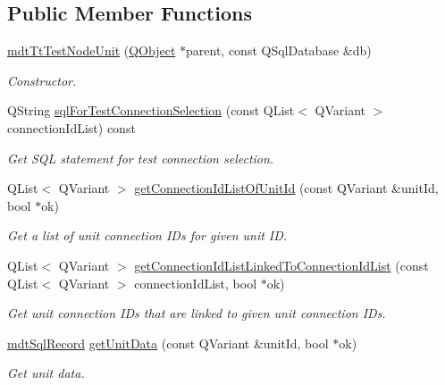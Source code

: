 \subsection*{Public Member Functions}
\begin{DoxyCompactItemize}
\item 
\hyperlink{classmdt_tt_test_node_unit_a835947279a78b98325db60aebfb8a04d}{mdt\-Tt\-Test\-Node\-Unit} (\hyperlink{class_q_object}{Q\-Object} $\ast$parent, const Q\-Sql\-Database \&db)
\begin{DoxyCompactList}\small\item\em Constructor. \end{DoxyCompactList}\item 
Q\-String \hyperlink{classmdt_tt_test_node_unit_a18f34b24834aa9b51b7ae328d2358e17}{sql\-For\-Test\-Connection\-Selection} (const Q\-List$<$ Q\-Variant $>$ connection\-Id\-List) const 
\begin{DoxyCompactList}\small\item\em Get S\-Q\-L statement for test connection selection. \end{DoxyCompactList}\item 
Q\-List$<$ Q\-Variant $>$ \hyperlink{classmdt_tt_test_node_unit_a37ac0aafdc8bd850472be07062ea391c}{get\-Connection\-Id\-List\-Of\-Unit\-Id} (const Q\-Variant \&unit\-Id, bool $\ast$ok)
\begin{DoxyCompactList}\small\item\em Get a list of unit connection I\-Ds for given unit I\-D. \end{DoxyCompactList}\item 
Q\-List$<$ Q\-Variant $>$ \hyperlink{classmdt_tt_test_node_unit_a6625a34706221c627ce2b7ca8b3a3b20}{get\-Connection\-Id\-List\-Linked\-To\-Connection\-Id\-List} (const Q\-List$<$ Q\-Variant $>$ connection\-Id\-List, bool $\ast$ok)
\begin{DoxyCompactList}\small\item\em Get unit connection I\-Ds that are linked to given unit connection I\-Ds. \end{DoxyCompactList}\item 
\hyperlink{classmdt_sql_record}{mdt\-Sql\-Record} \hyperlink{classmdt_tt_test_node_unit_a62037b84333f04180d790942de24a927}{get\-Unit\-Data} (const Q\-Variant \&unit\-Id, bool $\ast$ok)
\begin{DoxyCompactList}\small\item\em Get unit data. \end{DoxyCompactList}\item 

\end{DoxyCompactItemize}
